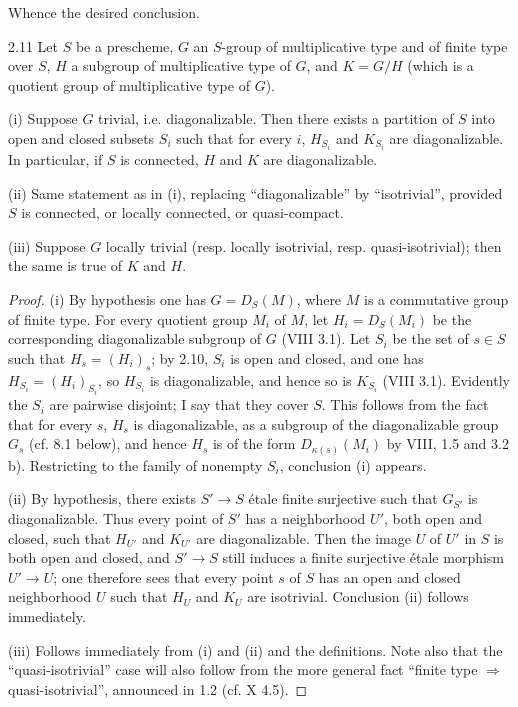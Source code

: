 Whence the desired conclusion.
\begin{proposition}{2.11}\label{IX.2.11}
Let $S$ be a prescheme, $G$ an $S$-group of multiplicative type and of finite type over $S$, $H$ a subgroup of multiplicative type of $G$, and $K=G/H$ (which is a quotient group of multiplicative type of $G$).

(i) Suppose $G$ trivial, i.e. diagonalizable. Then there exists a partition of $S$ into open and closed subsets $S_i$ such that for every $i$, $H_{S_i}$ and $K_{S_i}$ are diagonalizable. In particular, if $S$ is connected, $H$ and $K$ are diagonalizable.

(ii) Same statement as in (i), replacing ``diagonalizable'' by ``isotrivial'', provided $S$ is connected, or locally connected, or quasi-compact.

(iii) Suppose $G$ locally trivial (resp. locally isotrivial, resp. quasi-isotrivial); then the same is true of $K$ and $H$.
\end{proposition}
\begin{proof}
(i) By hypothesis one has $G=D_S(M)$, where $M$ is a commutative group of finite type. For every quotient group $M_i$ of $M$, let $H_i=D_S(M_i)$ be the corresponding diagonalizable subgroup of $G$ (VIII 3.1). Let $S_i$ be the set of $s\in S$ such that $H_s=(H_i)_s$; by 2.10, $S_i$ is open and closed, and one has $H_{S_i}=(H_i)_{S_i}$, so $H_{S_i}$ is diagonalizable, and hence so is $K_{S_i}$ (VIII 3.1). Evidently the $S_i$ are pairwise disjoint; I say that they cover $S$. This follows from the fact that for every $s$, $H_s$ is diagonalizable, as a subgroup of the diagonalizable group $G_s$ (cf. 8.1 below), and hence $H_s$ is of the form $D_{\kappa(s)}(M_i)$ by VIII, 1.5 and 3.2 b). Restricting to the family of nonempty $S_i$, conclusion (i) appears.

(ii) By hypothesis, there exists $S'\to S$ étale finite surjective such that $G_{S'}$ is diagonalizable. Thus every point of $S'$ has a neighborhood $U'$, both open and closed, such that $H_{U'}$ and $K_{U'}$ are diagonalizable. Then the image $U$ of $U'$ in $S$ is both open and closed, and $S'\to S$ still induces a finite surjective étale morphism $U'\to U$; one therefore sees that every point $s$ of $S$ has an open and closed neighborhood $U$ such that $H_U$ and $K_U$ are isotrivial. Conclusion (ii) follows immediately.

(iii) Follows immediately from (i) and (ii) and the definitions. Note also that the ``quasi-isotrivial'' case will also follow from the more general fact ``finite type $\Rightarrow$ quasi-isotrivial'', announced in 1.2 (cf. X 4.5).
\end{proof}

